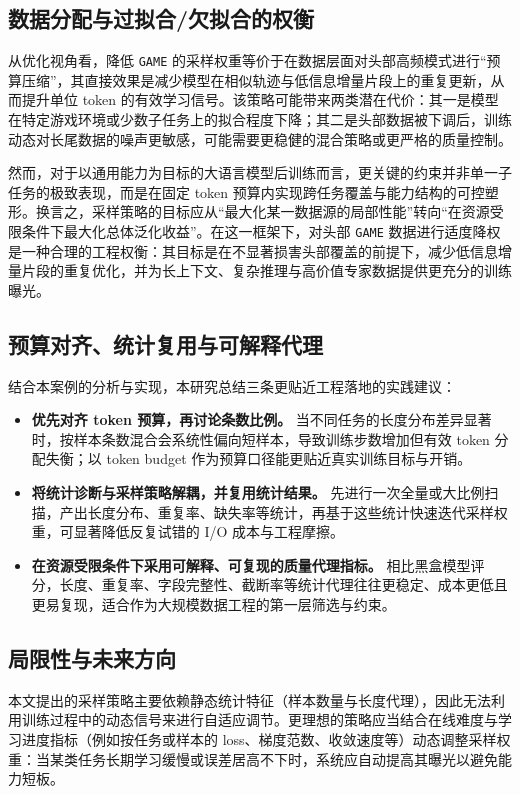 \documentclass[UTF8]{article}
\begin{document}
\subsection{数据分配与过拟合/欠拟合的权衡}\label{sec:bias_variance_tradeoff}
从优化视角看，降低 \texttt{GAME} 的采样权重等价于在数据层面对头部高频模式进行“预算压缩”，其直接效果是减少模型在相似轨迹与低信息增量片段上的重复更新，从而提升单位 token 的有效学习信号。该策略可能带来两类潜在代价：其一是模型在特定游戏环境或少数子任务上的拟合程度下降；其二是头部数据被下调后，训练动态对长尾数据的噪声更敏感，可能需要更稳健的混合策略或更严格的质量控制。

然而，对于以通用能力为目标的大语言模型后训练而言，更关键的约束并非单一子任务的极致表现，而是在固定 token 预算内实现跨任务覆盖与能力结构的可控塑形。换言之，采样策略的目标应从“最大化某一数据源的局部性能”转向“在资源受限条件下最大化总体泛化收益”。在这一框架下，对头部 \texttt{GAME} 数据进行适度降权是一种合理的工程权衡：其目标是在不显著损害头部覆盖的前提下，减少低信息增量片段的重复优化，并为长上下文、复杂推理与高价值专家数据提供更充分的训练曝光。

\subsection{预算对齐、统计复用与可解释代理}\label{sec:eng_recommendations}
结合本案例的分析与实现，本研究总结三条更贴近工程落地的实践建议：
\begin{itemize}
    \item \textbf{优先对齐 token 预算，再讨论条数比例。} 当不同任务的长度分布差异显著时，按样本条数混合会系统性偏向短样本，导致训练步数增加但有效 token 分配失衡；以 token budget 作为预算口径能更贴近真实训练目标与开销。
    \item \textbf{将统计诊断与采样策略解耦，并复用统计结果。} 先进行一次全量或大比例扫描，产出长度分布、重复率、缺失率等统计，再基于这些统计快速迭代采样权重，可显著降低反复试错的 I/O 成本与工程摩擦。
    \item \textbf{在资源受限条件下采用可解释、可复现的质量代理指标。} 相比黑盒模型评分，长度、重复率、字段完整性、截断率等统计代理往往更稳定、成本更低且更易复现，适合作为大规模数据工程的第一层筛选与约束。
\end{itemize}

\subsection{局限性与未来方向}\label{sec:limitations}
本文提出的采样策略主要依赖静态统计特征（样本数量与长度代理），因此无法利用训练过程中的动态信号来进行自适应调节。更理想的策略应当结合在线难度与学习进度指标（例如按任务或样本的 loss、梯度范数、收敛速度等）动态调整采样权重：当某类任务长期学习缓慢或误差居高不下时，系统应自动提高其曝光以避免能力短板。
\end{document}
